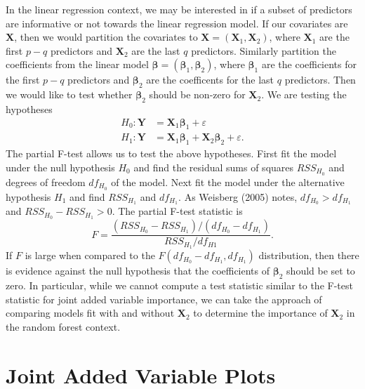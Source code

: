\documentclass[12pt,twoside]{reedthesis}
\theoremstyle{definition}
\theoremstyle{definition}
\theoremstyle{definition}
\theoremstyle{remark}
\begin{document}
In the linear regression context, we may be interested in if a subset of
predictors are informative or not towards the linear regression model.
If our covariates are \(\mathbf{X}\), then we would partition the
covariates to \(\mathbf{X}=(\mathbf{X}_1,\mathbf{X}_2)\), where
\(\mathbf{X}_1\) are the first \(p-q\) predictors and \(\mathbf{X}_2\)
are the last \(q\) predictors. Similarly partition the coefficients from
the linear model \(\mathbf{\beta}=(\mathbf{\beta}_1,\mathbf{\beta}_2)\),
where \(\mathbf{\beta}_1\) are the coefficients for the first \(p-q\)
predictors and \(\mathbf{\beta}_2\) are the coefficents for the last
\(q\) predictors. Then we would like to test whether
\(\mathbf{\beta}_2\) should be non-zero for \(\mathbf{X}_2\). We are
testing the hypotheses
\begin{align}
H_0: \mathbf{Y}&=\mathbf{X}_1\mathbf{\beta}_1+\varepsilon \nonumber \\
H_1: \mathbf{Y}&=\mathbf{X}_1\mathbf{\beta}_1+\mathbf{X}_2\mathbf{\beta}_2+\varepsilon. \nonumber
\end{align}
The partial F-test allows us to test the above hypotheses. First fit the
model under the null hypothesis \(H_0\) and find the residual sums of
squares \(RSS_{H_0}\) and degrees of freedom \(df_{H_0}\) of the model.
Next fit the model under the alternative hypothesis \(H_1\) and find
\(RSS_{H_1}\) and \(df_{H_1}\). As Weisberg (2005) notes,
\(df_{H_0}>df_{H_1}\) and \(RSS_{H_0}-RSS_{H_1}>0\). The partial F-test
statistic is
\[F=\frac{(RSS_{H_0}-RSS_{H_1})/(df_{H_0}-df_{H_1})}{RSS_{H_1}/df_{H1}}.\]
If \(F\) is large when compared to the
\(F(df_{H_0}-df_{H_1}, df_{H_1})\) distribution, then there is evidence
against the null hypothesis that the coefficients of
\(\mathbf{\beta}_2\) should be set to zero. In particular, while we
cannot compute a test statistic similar to the F-test statistic for
joint added variable importance, we can take the approach of comparing
models fit with and without \(\mathbf{X}_2\) to determine the importance
of \(\mathbf{X}_2\) in the random forest context. \par

\section{Joint Added Variable Plots}\label{joint-added-variable-plots}
\end{document}
